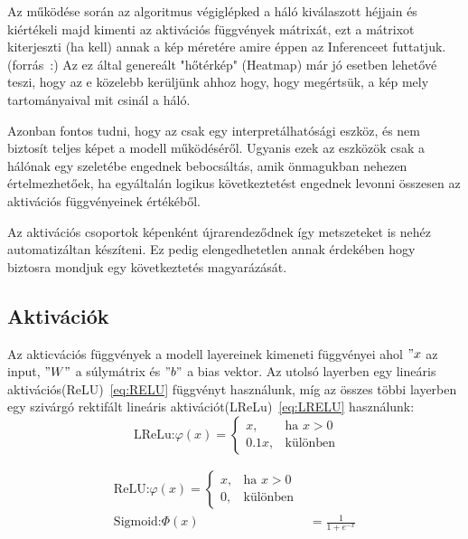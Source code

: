 \documentclass[12pt,oneside,a4paper]{article}
\theoremstyle{remark}
\begin{document}
    Az  működése során az algoritmus végiglépked a háló kiválaszott héjjain és kiértékeli majd kimenti az aktivációs függvények mátrixát, ezt a mátrixot kiterjeszti (ha kell) annak a kép méretére amire éppen az \gls{Inference}et futtatjuk. (forrás~\cite{muhammad2020eigencam}:)
    Az ez által genereált "hőtérkép" (Heatmap) már jó esetben lehetővé teszi, hogy az e közelebb kerüljünk ahhoz hogy, hogy megértsük, a kép mely tartományaival mit csinál a háló.

     Azonban fontos tudni, hogy az  csak egy interpretálhatósági eszköz, és nem biztosít teljes képet
     a modell működéséről.
     Ugyanis ezek az eszközök csak a hálónak egy szeletébe engednek bebocsáltás, amik önmagukban nehezen értelmezhetőek, ha egyáltalán logikus következtetést engednek levonni összesen az aktivációs függvényeinek értékéből.

     Az aktivációs csoportok képenként újrarendeződnek így metszeteket is nehéz automatizáltan készíteni. Ez pedig elengedhetetlen annak érdekében hogy biztosra mondjuk egy következtetés magyarázását.

\subsection{Aktivációk}\label{subsec:activations}
Az akticvációs függvények a modell layereinek kimeneti függvényei ahol \("x\) az input, \("W"\) a súlymátrix és \("b"\) a
    bias vektor.
        Az utolsó layerben egy lineáris aktivációs(\ac{ReLU})~\eqref{eq:RELU}\label{alignhivatkozas} függvényt használunk, míg az összes többi layerben egy
    szivárgó rektifált lineáris aktivációt(\ac{LReLu})~\eqref{eq:LRELU}\label{eqhivatkozas} használunk:
    \begin{equation}
        \text{ LReLu:}
    \varphi(x) = \begin{cases}
      x, & \text{ha } x > 0 \\
      0.1x, & \text{különben}
    \end{cases}\label{eq:LRELU}
    \end{equation}\label{eq:activation_functions}


    \begin{align}
    \text{ReLU:}
    \varphi(x)=\begin{cases}
      x, & \text{ha } x > 0 \\
      0, & \text{különben} \end{cases}\label{eq:RELU} \\
    \text{Sigmoid:}
    \varPhi(x) &= \frac{1}{1 + e^{-x}} \label{eq:Sigmoid}
    \end{align}
\end{document}
